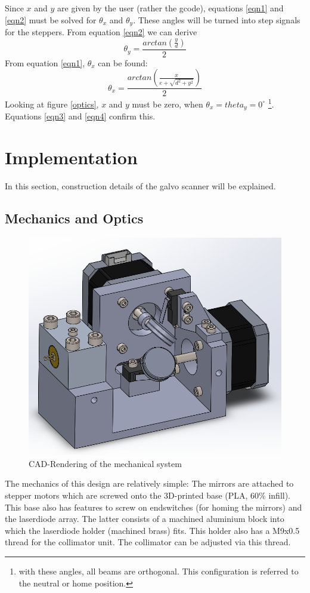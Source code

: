 \documentclass[a4paper, 11pt]{scrartcl}
\begin{document}
Since $x$ and $y$ are given by the user (rather the gcode), equations \ref{eqn1} and \ref{eqn2} must be solved for $\theta_x$ and $\theta_y$. These angles will be turned into step signals for the steppers. From equation \ref{eqn2} we can derive 
\begin{equation}\label{eqn3}
\theta_y = \frac{arctan(\frac{y}{d})}{2}
\end{equation} 
From equation \ref{eqn1}, $\theta_x$ can be found:
\begin{equation}\label{eqn4}
\theta_x=\frac{arctan\left( \frac{x}{e+\sqrt{d^2+y^2}}\right) }{2}
\end{equation}
Looking at figure \ref{optics}, $x$ and $y$ must be zero, when $\theta_x=theta_y=0^\circ$ \footnote{with these angles, all beams are orthogonal. This configuration is referred to the neutral or home position.}. Equations \ref{eqn3} and \ref{eqn4} confirm this. 

\section{Implementation}
In this section, construction details of the galvo scanner will be explained.
\subsection{Mechanics and Optics}
\begin{figure}[H]
\begin{center}
\includegraphics[width=15cm]{img/mechanics.png}
\caption{CAD-Rendering of the mechanical system}
\label{mechanics}
\end{center}
\end{figure}
The mechanics of this design are relatively simple: The mirrors are attached to stepper motors which are screwed onto the 3D-printed base (PLA, 60\% infill). This base also has features to screw on endswitches (for homing the mirrors) and the laserdiode array. The latter consists of a machined aluminium block into which the laserdiode holder (machined brass) fits. This holder also has a M9x0.5 thread for the collimator unit. The collimator can be adjusted via this thread.
\end{document}

